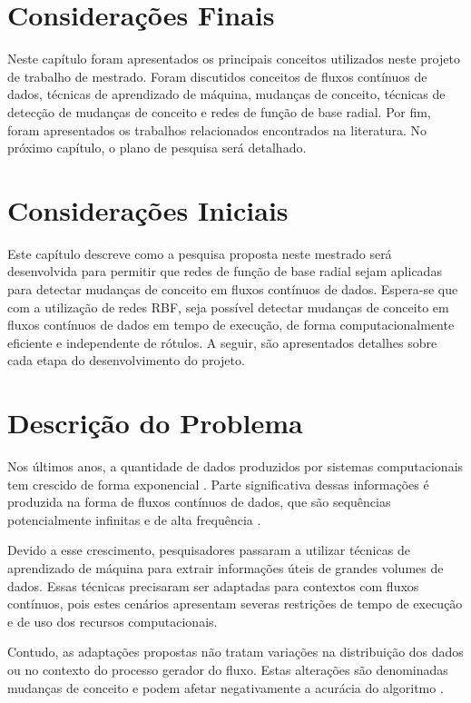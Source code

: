 \documentclass[qual, classic, a4paper]{ufbathesis}
\begin{document}
\section{Considerações Finais}

Neste capítulo foram apresentados os principais conceitos utilizados neste projeto de trabalho de mestrado.
Foram discutidos conceitos de fluxos contínuos de dados, 
técnicas de aprendizado de máquina, 
mudanças de conceito,
técnicas de detecção de mudanças de conceito e redes de função de base radial.
Por fim, foram apresentados os trabalhos relacionados encontrados na literatura.
No próximo capítulo, o plano de pesquisa será detalhado.

 \label{plano_pesquisa}
\section{Considerações Iniciais}

Este capítulo descreve como a pesquisa proposta neste mestrado será desenvolvida para permitir que redes de função de base radial sejam aplicadas para detectar mudanças de conceito em fluxos contínuos de dados.
Espera-se que com a utilização de redes RBF, seja possível detectar mudanças de conceito em fluxos contínuos de dados em tempo de execução, de forma computacionalmente eficiente e independente de rótulos.
A seguir, são apresentados detalhes sobre cada etapa do desenvolvimento do projeto.

\section{Descrição do Problema}

Nos últimos anos, a quantidade de dados produzidos por sistemas computacionais tem crescido de forma exponencial \cite{idc_report}.
Parte significativa dessas informações é produzida na forma de fluxos contínuos de dados, que são sequências potencialmente infinitas e de alta frequência \cite{Aggarwal:2006:DSM:1196418}.

Devido a esse crescimento, pesquisadores passaram a utilizar técnicas de aprendizado de máquina para extrair informações úteis de grandes volumes de dados.
Essas técnicas precisaram ser adaptadas para contextos com fluxos contínuos, pois estes cenários apresentam severas restrições de tempo de execução e de uso dos recursos computacionais.

Contudo, as adaptações propostas não tratam variações na distribuição dos dados ou no contexto do processo gerador do fluxo.
Estas alterações são denominadas mudanças de conceito e podem afetar negativamente a acurácia do algoritmo \cite{Gama:2014:SCD:2597757.2523813}.
\end{document}
